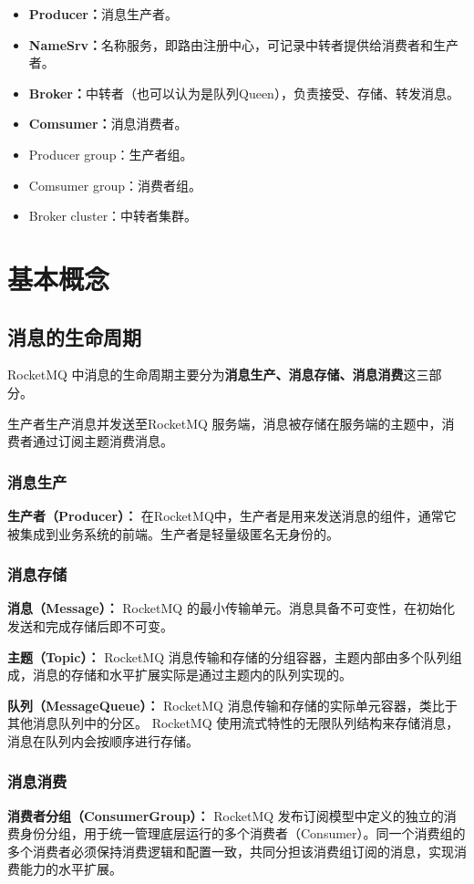 \documentclass[11pt, a4paper, oneside, fontset=none]{ctexbook}
\begin{document}
\begin{itemize}
  \item {\bfseries\kaishu Producer：}消息生产者。
  \item {\bfseries\kaishu NameSrv：}名称服务，即路由注册中心，可记录中转者提供给消费者和生产者。
  \item {\bfseries\kaishu Broker：}中转者（也可以认为是队列Queen），负责接受、存储、转发消息。
  \item {\bfseries\kaishu Comsumer：}消息消费者。
  \item Producer group：生产者组。
  \item Comsumer group：消费者组。
  \item Broker cluster：中转者集群。
\end{itemize}

\section{基本概念}

\subsection{消息的生命周期}
RocketMQ 中消息的生命周期主要分为{\bfseries\kaishu 消息生产、消息存储、消息消费}这三部分。

生产者生产消息并发送至RocketMQ 服务端，消息被存储在服务端的主题中，消费者通过订阅主题消费消息。

\subsubsection{消息生产}
\textbf{生产者（Producer）：}
在RocketMQ中，生产者是用来发送消息的组件，通常它被集成到业务系统的前端。生产者是轻量级匿名无身份的。

\subsubsection{消息存储}
\textbf{消息（Message）：}
RocketMQ 的最小传输单元。消息具备不可变性，在初始化发送和完成存储后即不可变。

\textbf{主题（Topic）：}
RocketMQ 消息传输和存储的分组容器，主题内部由多个队列组成，消息的存储和水平扩展实际是通过主题内的队列实现的。

\textbf{队列（MessageQueue）：}
RocketMQ 消息传输和存储的实际单元容器，类比于其他消息队列中的分区。 RocketMQ 使用流式特性的无限队列结构来存储消息，消息在队列内会按顺序进行存储。

\subsubsection{消息消费}
\textbf{消费者分组（ConsumerGroup）：}
RocketMQ 发布订阅模型中定义的独立的消费身份分组，用于统一管理底层运行的多个消费者（Consumer）。同一个消费组的多个消费者必须保持消费逻辑和配置一致，共同分担该消费组订阅的消息，实现消费能力的水平扩展。
\end{document}
